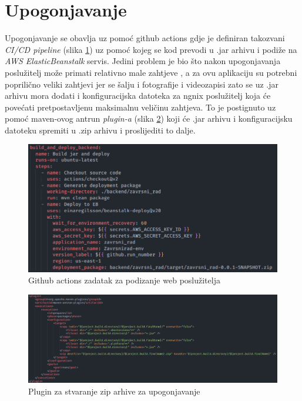 \documentclass[times, utf8, zavrsni]{fer}
\begin{document}
\section{Upogonjavanje}
Upogonjavanje se obavlja uz pomoć github actions gdje je definiran takozvani \textit{CI/CD pipeline}
(slika \ref{fig:Backend cicd}) uz pomoć kojeg se kod prevodi u .jar arhivu i podiže na \textit{AWS ElasticBeanstalk} servis.
Jedini problem je bio što nakon upogonjavanja poslužitelj može primati relativno male zahtjeve
, a za ovu aplikaciju su potrebni poprilično veliki zahtjevi jer se šalju i fotografije i videozapisi
zato se uz .jar arhivu mora dodati i konfiguracijska datoteka za ngnix poslužitelj koja će povećati
pretpostavljenu maksimalnu veličinu zahtjeva. To je postignuto uz pomoć maven-ovog antrun \textit{plugin-a}
(slika \ref{fig:antrun}) koji će .jar arhivu i konfiguracijsku datoteku spremiti u .zip arhivu i proslijediti to dalje.
\begin{figure}[h]
      \centering
      \includegraphics[width=.5\textwidth]{backend_cicd.png}
      \caption{Github actions zadatak za podizanje web poslužitelja}
      \label{fig:Backend cicd}
\end{figure}
\begin{figure}[h]
      \centering
      \includegraphics[width=\textwidth]{antrun.png}
      \caption{Plugin za stvaranje zip arhive za upogonjavanje}
      \label{fig:antrun}
\end{figure}
\end{document}

